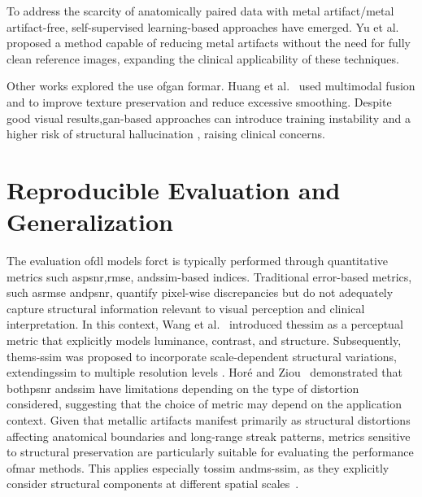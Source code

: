 To address the scarcity of anatomically paired data with metal artifact/metal artifact-free, self-supervised learning-based approaches have emerged. Yu et al.~\cite{yuMetalArtifactReduction2021} proposed a method capable of reducing metal artifacts without the need for fully clean reference images, expanding the clinical applicability of these techniques.

Other works explored the use of\acrfull{gan} for\acrshort{mar}. Huang et al.~\cite{huangMultimodalFeaturefusionCT2022} used multimodal fusion and to improve texture preservation and reduce excessive smoothing. Despite good visual results,\acrshort{gan}-based approaches can introduce training instability and a higher risk of structural hallucination \cite{yiGenerativeAdversarialNetwork2019}, raising clinical concerns. 


\section{Reproducible Evaluation and Generalization}

The evaluation of\acrshort{dl} models for\acrshort{ct} is typically performed through quantitative metrics such as\acrshort{psnr},\acrshort{rmse}, and\acrshort{ssim}-based indices. Traditional error-based metrics, such as\acrshort{rmse} and\acrshort{psnr}, quantify pixel-wise discrepancies but do not adequately capture structural information relevant to visual perception and clinical interpretation. In this context, Wang et al.~\cite{zhouwangImageQualityAssessment2004} introduced the\acrshort{ssim} as a perceptual metric that explicitly models luminance, contrast, and structure. Subsequently, the\acrfull{ms-ssim} was proposed to incorporate scale-dependent structural variations, extending\acrshort{ssim} to multiple resolution levels \cite{wangMultiscaleStructuralSimilarity2003a}. Hor{\'e} and Ziou~\cite{horeImageQualityMetrics2010} demonstrated that both\acrshort{psnr} and\acrshort{ssim} have limitations depending on the type of distortion considered, suggesting that the choice of metric may depend on the application context. Given that metallic artifacts manifest primarily as structural distortions affecting anatomical boundaries and long-range streak patterns, metrics sensitive to structural preservation are particularly suitable for evaluating the performance of\acrshort{mar} methods. This applies especially to\acrshort{ssim} and\acrshort{ms-ssim}, as they explicitly consider structural components at different spatial scales~\cite{zhouwangImageQualityAssessment2004,wangMultiscaleStructuralSimilarity2003a}.  

